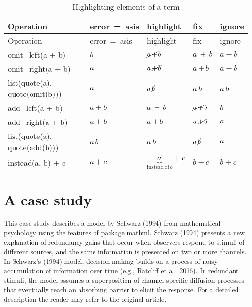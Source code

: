 \hypertarget{tab:mistakes}{}
\begin{longtable}[]{@{}lllll@{}}
\caption{Highlighting elements of a term}\tabularnewline
\toprule\noalign{}
Operation & error~=~asis & highlight & fix & ignore \\
\midrule\noalign{}
\endfirsthead
\toprule\noalign{}
Operation & error~=~asis & highlight & fix & ignore \\
\midrule\noalign{}
\endhead
\bottomrule\noalign{}
\endlastfoot
omit\_left(a + b) & \(b\) & \({\cancel{{a}{{\,}{+}}}}{{\,}{b}}\) & \({\boxed{{a}{{\,}{+}}}}{{\,}{b}}\) & \({a}{+}{b}\) \\
omit\_right(a + b) & \(a\) & \({a}{{\,}{\cancel{{+}{{\,}{b}}}}}\) & \({a}{{\,}{\boxed{{+}{{\,}{b}}}}}\) & \({a}{+}{b}\) \\
list(quote(a), quote(omit(b))) & \({a}{{\,}{\mathrm{}}}\) & \({a}{{\,}{\cancel{b}}}\) & \({a}{{\,}{\boxed{b}}}\) & \({a}{{\,}{b}}\) \\
add\_left(a + b) & \({a}{+}{b}\) & \({\boxed{{a}{{\,}{+}}}}{{\,}{b}}\) & \({\cancel{{a}{{\,}{+}}}}{{\,}{b}}\) & \(b\) \\
add\_right(a + b) & \({a}{+}{b}\) & \({a}{{\,}{\boxed{{+}{{\,}{b}}}}}\) & \({a}{{\,}{\cancel{{+}{{\,}{b}}}}}\) & \(a\) \\
list(quote(a), quote(add(b))) & \({a}{{\,}{b}}\) & \({a}{{\,}{\boxed{b}}}\) & \({a}{{\,}{\cancel{b}}}\) & \({a}{{\,}{\mathrm{}}}\) \\
instead(a, b) + c & \({a}{+}{c}\) & \({\underbrace{a}_{{\mathrm{instead}}{{\,}{\mathrm{of}}{{\,}{b}}}}}{+}{c}\) & \({\boxed{b}}{+}{c}\) & \({b}{+}{c}\) \\
\end{longtable}

\hypertarget{a-case-study}{%
\section{A case study}\label{a-case-study}}

This case study describes a model by Schwarz (1994) from mathematical
psychology using the features of package mathml. Schwarz (1994) presents
a new explanation of redundancy gains that occur when observers respond
to stimuli of different sources, and the same information is presented
on two or more channels. In Schwarz's (1994) model, decision-making
builds on a process of noisy accumulation of information over time
(e.g., Ratcliff et al.~2016). In redundant stimuli, the model assumes a
superposition of channel-specific diffusion processes that eventually
reach an absorbing barrier to elicit the response. For a detailed
description the reader may refer to the original article.

